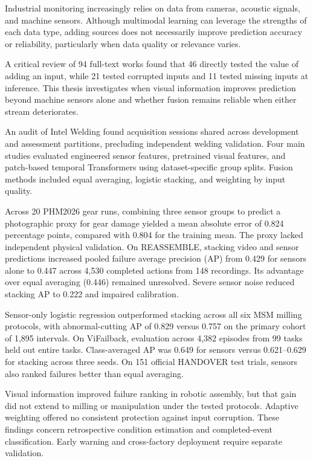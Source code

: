 
Industrial monitoring increasingly relies on data from cameras, acoustic signals, and
machine sensors. Although multimodal learning can leverage the strengths of each data
type, adding sources does not necessarily improve prediction accuracy or reliability,
particularly when data quality or relevance varies.

A critical review of 94 full-text works found that 46 directly tested the value of
adding an input, while 21 tested corrupted inputs and 11 tested missing inputs at
inference. This thesis investigates when visual information improves prediction beyond
machine sensors alone and whether fusion remains reliable when either stream
deteriorates.

An audit of Intel Welding found acquisition sessions shared across development and
assessment partitions, precluding independent welding validation. Four main studies
evaluated engineered sensor features, pretrained visual features, and patch-based
temporal Transformers using dataset-specific group splits. Fusion methods included
equal averaging, logistic stacking, and weighting by input quality.

Across 20 PHM2026 gear runs, combining three sensor groups to predict a photographic
proxy for gear damage yielded a mean absolute error of 0.824 percentage points,
compared with 0.804 for the training mean. The proxy lacked independent physical
validation. On REASSEMBLE, stacking video and sensor predictions increased pooled
failure average precision (AP) from 0.429 for sensors alone to 0.447 across 4,530
completed actions from 148 recordings. Its advantage over equal averaging (0.446)
remained unresolved. Severe sensor noise reduced stacking AP to 0.222 and impaired
calibration.

Sensor-only logistic regression outperformed stacking across all six MSM milling
protocols, with abnormal-cutting AP of 0.829 versus 0.757 on the primary cohort of
1,895 intervals. On ViFailback, evaluation across 4,382 episodes from 99 tasks held out
entire tasks. Class-averaged AP was 0.649 for sensors versus 0.621--0.629 for stacking
across three seeds. On 151 official HANDOVER test trials, sensors also ranked failures
better than equal averaging.

Visual information improved failure ranking in robotic assembly, but that gain did not
extend to milling or manipulation under the tested protocols. Adaptive weighting
offered no consistent protection against input corruption. These findings concern
retrospective condition estimation and completed-event classification. Early warning
and cross-factory deployment require separate validation.
